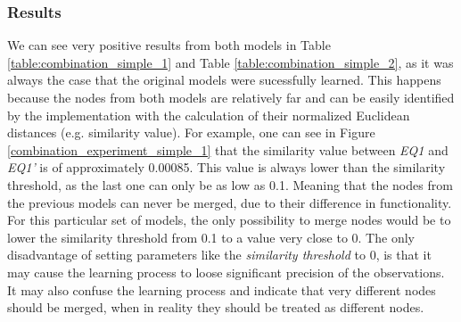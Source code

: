 \subsubsection{ Results}
We can see very positive results from both models in Table \ref{table:combination_simple_1} and Table \ref{table:combination_simple_2}, as it was always the case that the original models were sucessfully learned. This happens because the nodes from both models are relatively far and can be easily identified by the implementation with the calculation of their normalized Euclidean distances (e.g. similarity value). For example, one can see in Figure \ref{combination_experiment_simple_1} that the similarity value between \textit{EQ1} and \textit{EQ1'} is of approximately 0.00085. This value is always lower than the similarity threshold, as the last one can only be as low as 0.1. Meaning that the nodes from the previous models can never be merged, due to their difference in functionality. For this particular set of models, the only possibility to merge nodes would be to lower the similarity threshold from 0.1 to a value very close to 0. The only disadvantage of setting parameters like the \textit{similarity threshold} to 0, is that it may cause the learning process to loose significant precision of the observations. It may also confuse the learning process and indicate that very different nodes should be merged, when in reality they should be treated as different nodes.
\newpage
